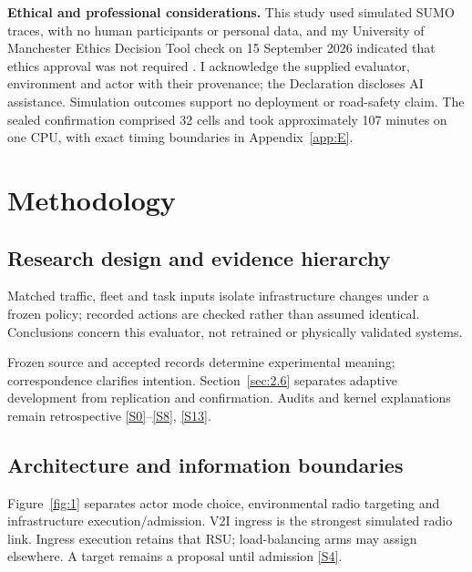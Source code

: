 \documentclass[12pt,a4paper]{article}
\begin{document}
\textbf{Ethical and professional considerations.} This study used simulated SUMO traces, with no human participants or personal data, and my University of Manchester Ethics Decision Tool check on 15 September 2026 indicated that ethics approval was not required \cite{ref44}. I acknowledge the supplied evaluator, environment and actor with their provenance; the Declaration discloses AI assistance. Simulation outcomes support no deployment or road-safety claim. The sealed confirmation comprised 32 cells and took approximately 107 minutes on one CPU, with exact timing boundaries in Appendix~\ref{app:E}.

\FloatBarrier
\section{Methodology}\label{sec:2}

\FloatBarrier
\subsection{Research design and evidence hierarchy}\label{sec:2.1}

Matched traffic, fleet and task inputs isolate infrastructure changes under a frozen policy; recorded actions are checked rather than assumed identical. Conclusions concern this evaluator, not retrained or physically validated systems.

Frozen source and accepted records determine experimental meaning; correspondence clarifies intention. Section~\ref{sec:2.6} separates adaptive development from replication and confirmation. Audits and kernel explanations remain retrospective \hyperref[source-s0]{[S0]}--\hyperref[source-s8]{[S8]}, \hyperref[source-s13]{[S13]}.

\FloatBarrier
\subsection{Architecture and information boundaries}\label{sec:2.2}

Figure~\ref{fig:1} separates actor mode choice, environmental radio targeting and infrastructure execution/admission. V2I ingress is the strongest simulated radio link. Ingress execution retains that RSU; load-balancing arms may assign elsewhere. A target remains a proposal until admission \hyperref[source-s4]{[S4]}.
\end{document}
